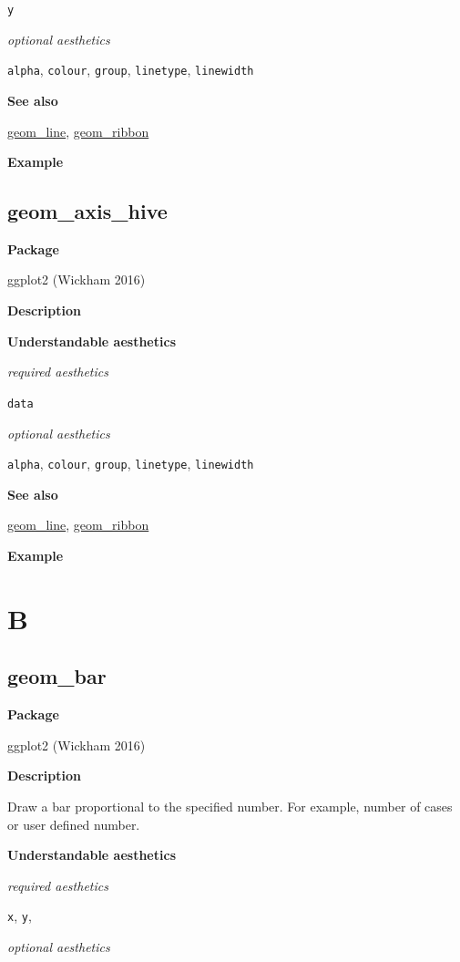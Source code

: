 \documentclass[
  letterpaper,
  DIV=11,
  numbers=noendperiod]{scrreprt}
\begin{document}
\texttt{y}

\emph{optional aesthetics}

\texttt{alpha}, \texttt{colour}, \texttt{group}, \texttt{linetype},
\texttt{linewidth}

\textbf{See also}

\hyperref[line]{geom\_line}, \hyperref[ribbon]{geom\_ribbon}

\textbf{Example}

\section{geom\_axis\_hive}\label{geom_axis_hive}

\textbf{Package}

ggplot2 (Wickham 2016)

\textbf{Description}

\textbf{Understandable aesthetics}

\emph{required aesthetics}

\texttt{data}

\emph{optional aesthetics}

\texttt{alpha}, \texttt{colour}, \texttt{group}, \texttt{linetype},
\texttt{linewidth}

\textbf{See also}

\hyperref[line]{geom\_line}, \hyperref[ribbon]{geom\_ribbon}

\textbf{Example}


\chapter{B}\label{sec-b}

\section{geom\_bar}\label{bar}

\textbf{Package}

ggplot2 (Wickham 2016)

\textbf{Description}

Draw a bar proportional to the specified number. For example, number of
cases or user defined number.

\textbf{Understandable aesthetics}

\emph{required aesthetics}

\texttt{x}, \texttt{y},

\emph{optional aesthetics}
\end{document}
